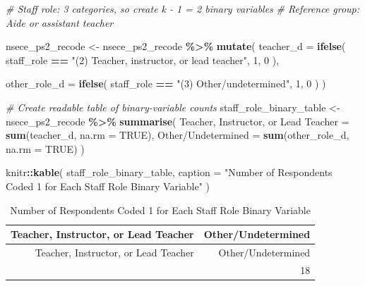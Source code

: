 \documentclass[
]{article}
\newenvironment{Shaded}{\begin{snugshade}}{\end{snugshade}}
\newcommand{\AttributeTok}[1]{\textcolor[rgb]{0.13,0.29,0.53}{#1}}
\newcommand{\CommentTok}[1]{\textcolor[rgb]{0.56,0.35,0.01}{\textit{#1}}}
\newcommand{\ConstantTok}[1]{\textcolor[rgb]{0.56,0.35,0.01}{#1}}
\newcommand{\DecValTok}[1]{\textcolor[rgb]{0.00,0.00,0.81}{#1}}
\newcommand{\FunctionTok}[1]{\textcolor[rgb]{0.13,0.29,0.53}{\textbf{#1}}}
\newcommand{\NormalTok}[1]{#1}
\newcommand{\OtherTok}[1]{\textcolor[rgb]{0.56,0.35,0.01}{#1}}
\newcommand{\SpecialCharTok}[1]{\textcolor[rgb]{0.81,0.36,0.00}{\textbf{#1}}}
\newcommand{\StringTok}[1]{\textcolor[rgb]{0.31,0.60,0.02}{#1}}
\begin{document}
\begin{Shaded}
\begin{Highlighting}[]
\CommentTok{\# Staff role: 3 categories, so create k {-} 1 = 2 binary variables}
\CommentTok{\# Reference group: Aide or assistant teacher}

\NormalTok{nsece\_ps2\_recode }\OtherTok{\textless{}{-}}
\NormalTok{  nsece\_ps2\_recode }\SpecialCharTok{\%\textgreater{}\%}
  \FunctionTok{mutate}\NormalTok{(}
    \AttributeTok{teacher\_d =} \FunctionTok{ifelse}\NormalTok{(}
\NormalTok{      staff\_role }\SpecialCharTok{==} \StringTok{"(2) Teacher, instructor, or lead teacher"}\NormalTok{, }\DecValTok{1}\NormalTok{, }\DecValTok{0}
\NormalTok{    ),}
    
    \AttributeTok{other\_role\_d =} \FunctionTok{ifelse}\NormalTok{(}
\NormalTok{      staff\_role }\SpecialCharTok{==} \StringTok{"(3) Other/undetermined"}\NormalTok{, }\DecValTok{1}\NormalTok{, }\DecValTok{0}
\NormalTok{    )}
\NormalTok{  )}

\CommentTok{\# Create readable table of binary{-}variable counts}
\NormalTok{staff\_role\_binary\_table }\OtherTok{\textless{}{-}}
\NormalTok{  nsece\_ps2\_recode }\SpecialCharTok{\%\textgreater{}\%}
  \FunctionTok{summarise}\NormalTok{(}
    \StringTok{\textasciigrave{}}\AttributeTok{Teacher, Instructor, or Lead Teacher}\StringTok{\textasciigrave{}} \OtherTok{=} \FunctionTok{sum}\NormalTok{(teacher\_d, }\AttributeTok{na.rm =} \ConstantTok{TRUE}\NormalTok{),}
    \StringTok{\textasciigrave{}}\AttributeTok{Other/Undetermined}\StringTok{\textasciigrave{}} \OtherTok{=} \FunctionTok{sum}\NormalTok{(other\_role\_d, }\AttributeTok{na.rm =} \ConstantTok{TRUE}\NormalTok{)}
\NormalTok{  )}

\NormalTok{knitr}\SpecialCharTok{::}\FunctionTok{kable}\NormalTok{(}
\NormalTok{  staff\_role\_binary\_table,}
  \AttributeTok{caption =} \StringTok{"Number of Respondents Coded 1 for Each Staff Role Binary Variable"}
\NormalTok{)}
\end{Highlighting}
\end{Shaded}

\begin{longtable}[]{@{}rr@{}}
\caption{Number of Respondents Coded 1 for Each Staff Role Binary
Variable}\tabularnewline
\toprule\noalign{}
Teacher, Instructor, or Lead Teacher & Other/Undetermined \\
\midrule\noalign{}
\endfirsthead
\toprule\noalign{}
Teacher, Instructor, or Lead Teacher & Other/Undetermined \\
\midrule\noalign{}
\endhead
\bottomrule\noalign{}
\endlastfoot
3079 & 18 \\
\end{longtable}
\end{document}

